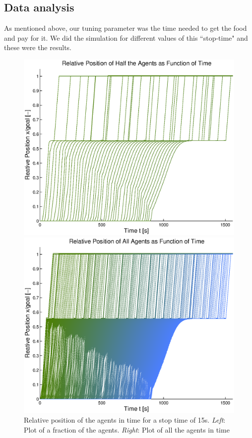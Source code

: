 \documentclass[11pt]{article}
\begin{document}
\subsection{Data analysis}

As mentioned above, our tuning parameter was the time needed to get the food and pay for it. We did the simulation for different values of this ``stop-time" and these were the results.
\begin{figure}[h]
 	\begin{minipage}[t]{0.48\textwidth}
		\includegraphics[width = \textwidth]{Images/RESULTS03_Stop15/PositionFracAgents.eps}
 	 \end{minipage}
  	\hfill
  	\begin{minipage}[t]{0.48\textwidth}
   		 \includegraphics[width = \textwidth]{Images/RESULTS03_Stop15/PositionAllAgents.eps}
  	\end{minipage}
  	\caption{Relative position of the agents in time for a stop time of 15s. \emph{Left}: Plot of a fraction of the agents. \emph{Right}: Plot of all the agents in time}
  	\label{img:stopTime15Agents}
\end{figure}
\end{document}
